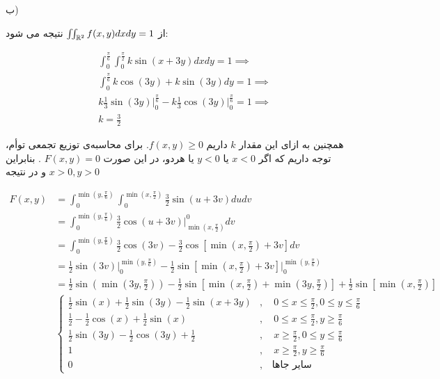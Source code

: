 \documentclass[10pt,letterpaper]{report}
\newcommand{\eqn}[1]{
\[\begin{split}
#1
\end{split}\]
}
\begin{document}
ب)

از 
$
\iint_{\Bbb R^2}f(x,y)dxdy=1
$
نتیجه می شود:
\eqn{
&\int_0^\frac{\pi}{6}\int_0^\frac{\pi}{2}k\sin(x+3y)dxdy=1\implies
\\&\int_0^\frac{\pi}{6}k\cos(3y)+k\sin(3y)dy=1\implies
\\&k\frac{1}{3}\sin(3y)\Big|_0^\frac{\pi}{6}-k\frac{1}{3}\cos(3y)\Big|_0^\frac{\pi}{6}=1\implies
\\&k=\frac{3}{2}
}
همچنین به ازای این مقدار $k$ داریم
$
f(x,y)\ge 0
$.
برای محاسبه‌ی توزیع تجمعی توأم، توجه داریم که اگر 
$
x<0
$
یا 
$
y<0
$
یا هردو، در این صورت
$
F(x,y)=0
$
.
بنابراین 
$
x>0,y>0
$
و در نتیجه
\eqn{
F(x,y)&=
\int_0^{\min(y,\frac{\pi}{6})}\int_0^{\min(x,\frac{\pi}{2})} \frac{3}{2}\sin(u+3v)dudv
\\&=
\int_0^{\min(y,\frac{\pi}{6})} \frac{3}{2}\cos(u+3v)\Big|_{\min(x,\frac{\pi}{2})}^0dv
\\&=
\int_0^{\min(y,\frac{\pi}{6})} \frac{3}{2}\cos(3v)-\frac{3}{2}\cos\left[\min(x,\frac{\pi}{2})+3v\right]dv
\\&=
\frac{1}{2}\sin(3v)\Big|_0^{\min(y,\frac{\pi}{6})}-\frac{1}{2}\sin\left[\min(x,\frac{\pi}{2})+3v\right]\Big|_0^{\min(y,\frac{\pi}{6})}
\\&=
\frac{1}{2}\sin(\min(3y,\frac{\pi}{2}))-\frac{1}{2}\sin\left[\min(x,\frac{\pi}{2})+\min(3y,\frac{\pi}{2})\right]+
\frac{1}{2}\sin\left[\min(x,\frac{\pi}{2})\right]
\\&
\begin{cases}
\frac{1}{2}\sin(x)+\frac{1}{2}\sin(3y)-\frac{1}{2}\sin(x+3y)
&,\quad 0\le x\le \frac{\pi}{2},0\le y\le \frac{\pi}{6}\\
\frac{1}{2}-\frac{1}{2}\cos(x)+\frac{1}{2}\sin(x)
&,\quad 0\le x\le \frac{\pi}{2},y\ge \frac{\pi}{6}\\
\frac{1}{2}\sin(3y)-\frac{1}{2}\cos(3y)+\frac{1}{2}
&,\quad x\ge \frac{\pi}{2},0\le y\le \frac{\pi}{6}\\
1
&,\quad x\ge \frac{\pi}{2},y\ge \frac{\pi}{6}\\
0&,\quad \text{سایر جاها}
\end{cases}
}


%
\end{document}
